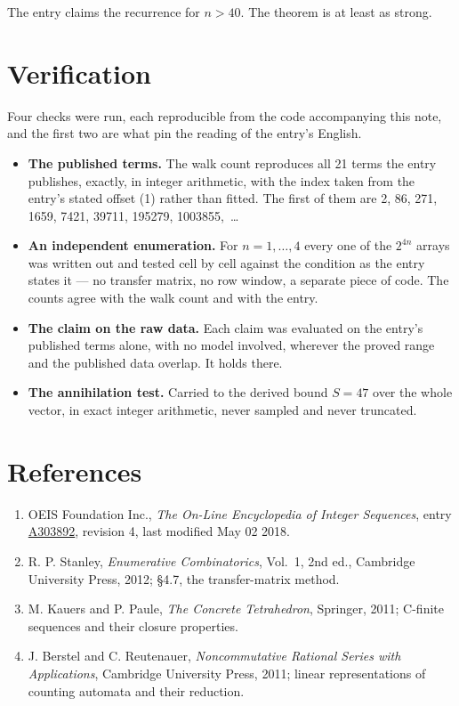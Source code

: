 \documentclass[11pt]{article}
\theoremstyle{definition}
\begin{document}
The entry claims the recurrence for $n > 40$. The theorem is at least as strong.

\section{Verification}

Four checks were run, each reproducible from the code accompanying this note, and the first two are what pin the reading of the entry's English.

\begin{itemize}

\item {\bfseries The published terms.} The walk count reproduces all 21 terms the entry publishes, exactly, in integer arithmetic, with the index taken from the entry's stated offset (1) rather than fitted. The first of them are 2, 86, 271, 1659, 7421, 39711, 195279, 1003855,~\dots

\item {\bfseries An independent enumeration.} For $n = 1,\dots,4$ every one of the $2^{4n}$ arrays was written out and tested cell by cell against the condition as the entry states it --- no transfer matrix, no row window, a separate piece of code. The counts agree with the walk count and with the entry.

\item {\bfseries The claim on the raw data.} Each claim was evaluated on the entry's published terms alone, with no model involved, wherever the proved range and the published data overlap. It holds there.

\item {\bfseries The annihilation test.} Carried to the derived bound $S = 47$ over the whole vector, in exact integer arithmetic, never sampled and never truncated.

\end{itemize}

\section{References}

\begin{enumerate}

\item OEIS Foundation Inc., \emph{The On-Line Encyclopedia of Integer Sequences}, entry \href{https://oeis.org/A303892}{A303892}, revision 4, last modified May 02 2018.

\item R. P. Stanley, \emph{Enumerative Combinatorics}, Vol.~1, 2nd ed., Cambridge University Press, 2012; \S4.7, the transfer-matrix method.

\item M. Kauers and P. Paule, \emph{The Concrete Tetrahedron}, Springer, 2011; C-finite sequences and their closure properties.

\item J. Berstel and C. Reutenauer, \emph{Noncommutative Rational Series with Applications}, Cambridge University Press, 2011; linear representations of counting automata and their reduction.

\end{enumerate}
\end{document}
